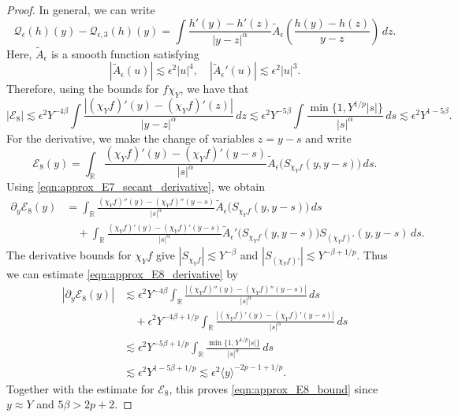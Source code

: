 \documentclass[11pt]{amsart}
\theoremstyle{definition}
\theoremstyle{remark}
\numberwithin{equation}{section}
\newcommand{\sq}[1]{\widetilde{#1}}
\newcommand{\R}{\mathbb{R}}
\newcommand{\mc}[1]{\mathcal{#1}}
\newcommand{\ang}[1]{\langle #1 \rangle}
\begin{document}
\begin{proof}
    In general, we can write
    \[\mc{Q}_{\epsilon}(h)(y) - \mc{Q}_{\epsilon, 3}(h)(y) = \int \frac{h'(y) - h'(z)}{|y - z|^\alpha}\sq{A}_\epsilon\left(\frac{h(y) - h(z)}{y - z}\right) \, dz.\]
    Here, $\sq{A}_\epsilon$ is a smooth function satisfying 
    \[|\sq{A}_\epsilon(u)| \lesssim \epsilon^2 |u|^4, \quad |\sq{A}_\epsilon'(u)| \lesssim \epsilon^2 |u|^3.\]
    Therefore, using the bounds for $f \chi_Y$, we have that 
    \[|\mc{E}_8| \lesssim \epsilon^2 Y^{-4\beta} \int \frac{|(\chi_Y f)'(y) - (\chi_Y f)'(z)|}{|y - z|^\alpha} \, dz \lesssim \epsilon^2 Y^{-5\beta} \int \frac{\min\{1, Y^{1/p}|s|\}}{|s|^\alpha} \, ds \lesssim \epsilon^2 Y^{1 - 5\beta}.\]
    For the derivative, we make the change of variables $z=y-s$ and write
    \begin{equation}\label{eqn:approx_E8_translated}
        \mc{E}_8(y)=\int_{\R}\frac{(\chi_Y f)'(y)-(\chi_Y f)'(y-s)}{|s|^\alpha}\sq{A}_\epsilon\bigl(S_{\chi_Y f}(y,y-s)\bigr)\,ds.
    \end{equation}
    Using \eqref{eqn:approx_E7_secant_derivative}, we obtain
    \begin{equation}\label{eqn:approx_E8_derivative}
        \begin{aligned}
            \partial_y\mc{E}_8(y)
            & = \int_{\R}\frac{(\chi_Y f)''(y)-(\chi_Y f)''(y-s)}{|s|^\alpha}\sq{A}_\epsilon\bigl(S_{\chi_Y f}(y,y-s)\bigr)\,ds\\
            & \quad +\int_{\R}\frac{(\chi_Y f)'(y)-(\chi_Y f)'(y-s)}{|s|^\alpha}\sq{A}_\epsilon'\bigl(S_{\chi_Y f}(y,y-s)\bigr)S_{(\chi_Y f)'}(y,y-s)\,ds.
        \end{aligned}
    \end{equation}
    The derivative bounds for $\chi_Y f$ give $|S_{\chi_Y f}|\lesssim Y^{-\beta}$ and $|S_{(\chi_Y f)'}|\lesssim Y^{-\beta+1/p}$. Thus we can estimate \eqref{eqn:approx_E8_derivative} by
    \begin{align*}
        |\partial_y\mc{E}_8(y)|
        &\lesssim\epsilon^2Y^{-4\beta}\int_{\R}\frac{|(\chi_Y f)''(y)-(\chi_Y f)''(y-s)|}{|s|^\alpha}\,ds\\
        &\quad+\epsilon^2Y^{-4\beta+1/p}\int_{\R}\frac{|(\chi_Y f)'(y)-(\chi_Y f)'(y-s)|}{|s|^\alpha}\,ds\\
        &\lesssim\epsilon^2Y^{-5\beta+1/p}\int_{\R}\frac{\min\{1,Y^{1/p}|s|\}}{|s|^\alpha}\,ds\\
        &\lesssim\epsilon^2Y^{1-5\beta+1/p}
        \lesssim\epsilon^2\ang{y}^{-2p-1+1/p}.
    \end{align*}
    Together with the estimate for $\mc{E}_8$, this proves \eqref{eqn:approx_E8_bound} since $y\approx Y$ and $5\beta>2p+2$.
\end{proof}
\end{document}
